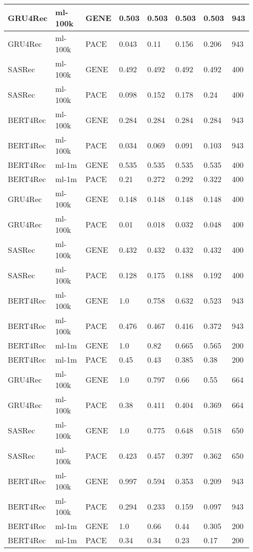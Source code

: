 \begin{longtable}{|l|l|l|l|l|l|l|l|}
GRU4Rec & ml-100k & GENE & 0.503 & 0.503 & 0.503 & 0.503 & 943 \\ \hline
GRU4Rec & ml-100k & PACE & 0.043 & 0.11 & 0.156 & 0.206 & 943 \\ \hline
SASRec & ml-100k & GENE & 0.492 & 0.492 & 0.492 & 0.492 & 400 \\ \hline
SASRec & ml-100k & PACE & 0.098 & 0.152 & 0.178 & 0.24 & 400 \\ \hline
BERT4Rec & ml-100k & GENE & 0.284 & 0.284 & 0.284 & 0.284 & 943 \\ \hline
BERT4Rec & ml-100k & PACE & 0.034 & 0.069 & 0.091 & 0.103 & 943 \\ \hline
BERT4Rec & ml-1m & GENE & 0.535 & 0.535 & 0.535 & 0.535 & 400 \\ \hline
BERT4Rec & ml-1m & PACE & 0.21 & 0.272 & 0.292 & 0.322 & 400 \\ \hline
GRU4Rec & ml-100k & GENE & 0.148 & 0.148 & 0.148 & 0.148 & 400 \\ \hline
GRU4Rec & ml-100k & PACE & 0.01 & 0.018 & 0.032 & 0.048 & 400 \\ \hline
SASRec & ml-100k & GENE & 0.432 & 0.432 & 0.432 & 0.432 & 400 \\ \hline
SASRec & ml-100k & PACE & 0.128 & 0.175 & 0.188 & 0.192 & 400 \\ \hline
BERT4Rec & ml-100k & GENE & 1.0 & 0.758 & 0.632 & 0.523 & 943 \\ \hline
BERT4Rec & ml-100k & PACE & 0.476 & 0.467 & 0.416 & 0.372 & 943 \\ \hline
BERT4Rec & ml-1m & GENE & 1.0 & 0.82 & 0.665 & 0.565 & 200 \\ \hline
BERT4Rec & ml-1m & PACE & 0.45 & 0.43 & 0.385 & 0.38 & 200 \\ \hline
GRU4Rec & ml-100k & GENE & 1.0 & 0.797 & 0.66 & 0.55 & 664 \\ \hline
GRU4Rec & ml-100k & PACE & 0.38 & 0.411 & 0.404 & 0.369 & 664 \\ \hline
SASRec & ml-100k & GENE & 1.0 & 0.775 & 0.648 & 0.518 & 650 \\ \hline
SASRec & ml-100k & PACE & 0.423 & 0.457 & 0.397 & 0.362 & 650 \\ \hline
BERT4Rec & ml-100k & GENE & 0.997 & 0.594 & 0.353 & 0.209 & 943 \\ \hline
BERT4Rec & ml-100k & PACE & 0.294 & 0.233 & 0.159 & 0.097 & 943 \\ \hline
BERT4Rec & ml-1m & GENE & 1.0 & 0.66 & 0.44 & 0.305 & 200 \\ \hline
BERT4Rec & ml-1m & PACE & 0.34 & 0.34 & 0.23 & 0.17 & 200 \\ \hline

\end{longtable}
